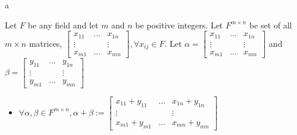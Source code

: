\documentclass[8pt]{beamer}
\begin{document}
\begin{frame}{a}
    \begin{example}
        Let $F$ be any field and let $m$ and $n$ be positive integers. Let $F^{m \times n}$ be set of all $m \times n$ matrices, $\left[\begin{matrix}
            x_{11} & \dots & x_{1n} \\ \vdots & & \vdots \\ x_{m1} & \dots &x_{mn} 
        \end{matrix}\right], \forall x_{ij} \in F$. Let $\alpha = \left[\begin{matrix}
            x_{11} & \dots & x_{1n} \\ \vdots & & \vdots \\ x_{m1} & \dots &x_{mn} 
        \end{matrix}\right]$ and $\beta = \left[\begin{matrix}
            y_{11} & \dots & y_{1n} \\ \vdots & & \vdots \\ y_{m1} & \dots &y_{mn} 
        \end{matrix}\right]$
        \begin{itemize}
            \item $\forall \alpha, \beta \in F^{m \times n}, \alpha + \beta := \left[\begin{matrix}
            x_{11}+y_{11} & \dots & x_{1n}+y_{1n} \\ \vdots & & \vdots \\ x_{m1}+y_{m1} & \dots &x_{mn}+y_{mn} 
        \end{matrix}\right]$
        \end{itemize}
    \end{example}
\end{frame}
\end{document}
